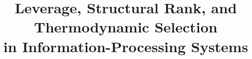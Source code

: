 \documentclass[11pt]{article}
\title{Leverage, Structural Rank, and Thermodynamic Selection\\in Information-Processing Systems}
\begin{document}
\maketitle
\pentalogyfooter


\begin{abstract}

\end{abstract}

















\end{document}
